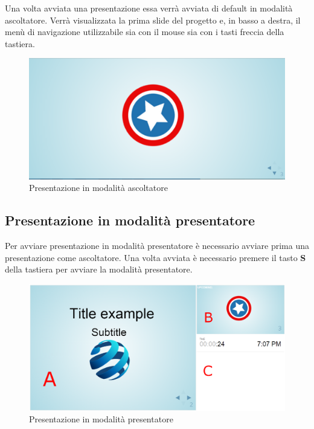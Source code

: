 \noindent Una volta avviata una presentazione essa verrà avviata di default in modalità ascoltatore. Verrà visualizzata la prima slide del progetto e, in basso a destra, il menù di navigazione utilizzabile sia con il mouse sia con i tasti freccia della tastiera. 
\begin{figure}[H] 
	\centering 
	\includegraphics[scale=0.40] {img/sfondook.png}
	\caption{Presentazione in modalità ascoltatore} 
\end{figure}


\subsection{Presentazione in modalità presentatore}
\noindent Per avviare presentazione in modalità presentatore è necessario avviare prima una presentazione come ascoltatore. Una volta avviata è necessario premere il tasto \textbf{S} della tastiera per avviare la modalità presentatore.
\begin{figure}[H] 
	\centering 
	\includegraphics[scale=0.40] {img/note.png}
	\caption{Presentazione in modalità presentatore} 
\end{figure}

